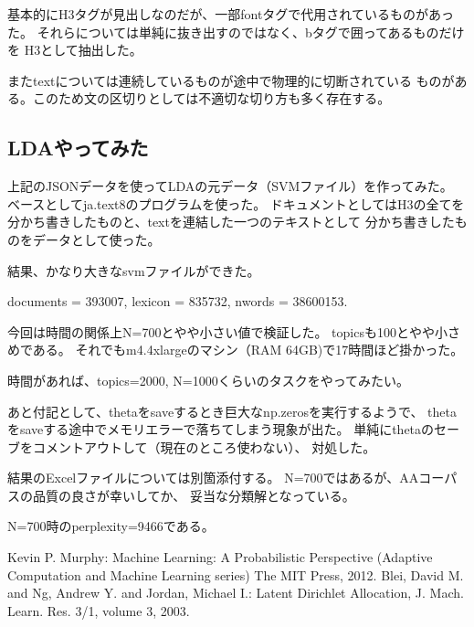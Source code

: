 \documentclass[uplatex]{jsarticle}
\begin{document}
基本的にH3タグが見出しなのだが、一部fontタグで代用されているものがあった。
それらについては単純に抜き出すのではなく、bタグで囲ってあるものだけを
H3として抽出した。

またtextについては連続しているものが途中で物理的に切断されている
ものがある。このため文の区切りとしては不適切な切り方も多く存在する。

\subsection{LDAやってみた}
上記のJSONデータを使ってLDAの元データ（SVMファイル）を作ってみた。
ベースとしてja.text8のプログラムを使った。
ドキュメントとしてはH3の全てを分かち書きしたものと、textを連結した一つのテキストとして
分かち書きしたものをデータとして使った。

結果、かなり大きなsvmファイルができた。

documents = 393007, lexicon = 835732, nwords = 38600153.

今回は時間の関係上N=700とやや小さい値で検証した。
topicsも100とやや小さめである。
それでもm4.4xlargeのマシン（RAM 64GB)で17時間ほど掛かった。

時間があれば、topics=2000, N=1000くらいのタスクをやってみたい。

あと付記として、thetaをsaveするとき巨大なnp.zerosを実行するようで、
thetaをsaveする途中でメモリエラーで落ちてしまう現象が出た。
単純にthetaのセーブをコメントアウトして（現在のところ使わない）、
対処した。

結果のExcelファイルについては別箇添付する。
N=700ではあるが、AAコーパスの品質の良さが幸いしてか、
妥当な分類解となっている。

N=700時のperplexity=9466である。




\begin{thebibliography}{99}
   Kevin P. Murphy: Machine Learning: A Probabilistic Perspective (Adaptive Computation and Machine Learning series) The MIT Press, 2012.
   Blei, David M. and Ng, Andrew Y. and Jordan, Michael I.: Latent Dirichlet Allocation,
J. Mach. Learn. Res. 3/1, volume 3, 2003.
\end{thebibliography}
\end{document}
